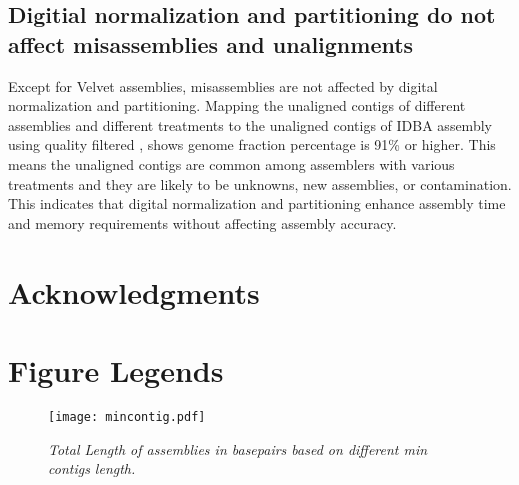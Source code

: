  \subsection*{Digitial normalization and partitioning do not  affect misassemblies and unalignments}
 
Except for Velvet assemblies, misassemblies are not affected by digital normalization and partitioning. 
Mapping the unaligned  contigs of different assemblies and different treatments to the unaligned contigs of  IDBA  assembly using quality filtered , shows genome fraction percentage is 91\% or higher. This means the unaligned contigs are common among assemblers with various treatments and they are likely to be unknowns, new assemblies, or contamination. This indicates that digital normalization and partitioning enhance assembly time and memory requirements without affecting assembly accuracy.  



  

\section*{Acknowledgments}



%
%
% 





\section*{Figure Legends}
%
\begin{figure} [h] 
\begin{center}  
\texttt{[image: mincontig.pdf]}  
\caption{\small \sl Total Length of assemblies in basepairs based on different min contigs length.\label{fig:mincontig}}  
\end{center}  
\end{figure}  
 

